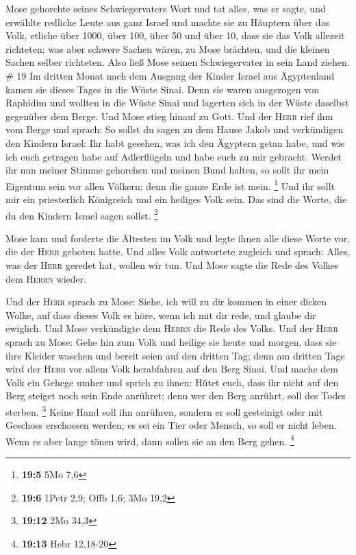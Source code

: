  Mose gehorchte seines Schwiegervaters Wort und tat
alles, was er sagte,  und erwählte redliche Leute aus
ganz Israel und machte sie zu Häuptern über das Volk, etliche über 1000,
über 100, über 50 und über 10,  dass sie das Volk
allezeit richteten; was aber schwere Sachen wären, zu Mose brächten, und
die kleinen Sachen selber richteten.  Also ließ Mose
seinen Schwiegervater in sein Land ziehen. \# 19  Im
dritten Monat nach dem Ausgang der Kinder Israel aus Ägyptenland kamen
sie dieses Tages in die Wüste Sinai.  Denn sie waren
ausgezogen von Raphidim und wollten in die Wüste Sinai und lagerten sich
in der Wüste daselbst gegenüber dem Berge.  Und Mose stieg
hinauf zu Gott. Und der \textsc{Herr} rief ihm vom Berge und sprach: So
sollst du sagen zu dem Hause Jakob und verkündigen den Kindern Israel:
 Ihr habt gesehen, was ich den Ägyptern getan habe, und
wie ich euch getragen habe auf Adlerflügeln und habe euch zu mir
gebracht.  Werdet ihr nun meiner Stimme gehorchen und
meinen Bund halten, so sollt ihr mein Eigentum sein vor allen Völkern;
denn die ganze Erde ist mein. \footnote{\textbf{19:5} 5Mo 7,6}
 Und ihr sollt mir ein priesterlich Königreich und ein
heiliges Volk sein. Das sind die Worte, die du den Kindern Israel sagen
sollst. \footnote{\textbf{19:6} 1Petr 2,9; Offb 1,6; 3Mo 19,2}

 Mose kam und forderte die Ältesten im Volk und legte
ihnen alle diese Worte vor, die der \textsc{Herr} geboten hatte.
 Und alles Volk antwortete zugleich und sprach: Alles, was
der \textsc{Herr} geredet hat, wollen wir tun. Und Mose sagte die Rede
des Volkes dem \textsc{Herrn} wieder.

 Und der \textsc{Herr} sprach zu Mose: Siehe, ich will zu
dir kommen in einer dicken Wolke, auf dass dieses Volk es höre, wenn ich
mit dir rede, und glaube dir ewiglich. Und Mose verkündigte dem
\textsc{Herrn} die Rede des Volks.  Und der \textsc{Herr}
sprach zu Mose: Gehe hin zum Volk und heilige sie heute und morgen, dass
sie ihre Kleider waschen  und bereit seien auf den
dritten Tag; denn am dritten Tage wird der \textsc{Herr} vor allem Volk
herabfahren auf den Berg Sinai.  Und mache dem Volk ein
Gehege umher und sprich zu ihnen: Hütet euch, dass ihr nicht auf den
Berg steiget noch sein Ende anrühret; denn wer den Berg anrührt, soll
des Todes sterben. \footnote{\textbf{19:12} 2Mo 34,3} 
Keine Hand soll ihn anrühren, sondern er soll gesteinigt oder mit
Geschoss erschossen werden; es sei ein Tier oder Mensch, so soll er
nicht leben. Wenn es aber lange tönen wird, dann sollen sie an den Berg
gehen. \footnote{\textbf{19:13} Hebr 12,18-20}

